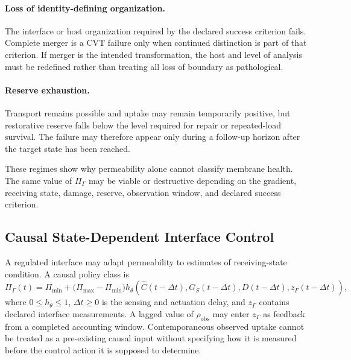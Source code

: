 \paragraph{Loss of identity-defining organization.}
The interface or host organization required by the declared success criterion fails. Complete merger is a CVT failure only when continued distinction is part of that criterion. If merger is the intended transformation, the host and level of analysis must be redefined rather than treating all loss of boundary as pathological.

\paragraph{Reserve exhaustion.}
Transport remains possible and uptake may remain temporarily positive, but restorative reserve falls below the level required for repair or repeated-load survival. The failure may therefore appear only during a follow-up horizon after the target state has been reached.

These regimes show why permeability alone cannot classify membrane health. The same value of \(\Pi_{\Gamma}\) may be viable or destructive depending on the gradient, receiving state, damage, reserve, observation window, and declared success criterion.

\subsection{Causal State-Dependent Interface Control}

A regulated interface may adapt permeability to estimates of receiving-state condition. A causal policy class is
\begin{equation}
    \Pi_{\Gamma}(t)
    =
    \Pi_{\min}
    +
    \bigl(\Pi_{\max}-\Pi_{\min}\bigr)
    h_{\theta}\!\left(
        \widehat C(t-\Delta t),
        G_S(t-\Delta t),
        D(t-\Delta t),
        z_{\Gamma}(t-\Delta t)
    \right),
    \label{eq:membrane-causal-control}
\end{equation}
where \(0\leq h_{\theta}\leq1\), \(\Delta t\geq0\) is the sensing and actuation delay, and \(z_{\Gamma}\) contains declared interface measurements. A lagged value of \(\rho_{\mathrm{obs}}\) may enter \(z_{\Gamma}\) as feedback from a completed accounting window. Contemporaneous observed uptake cannot be treated as a pre-existing causal input without specifying how it is measured before the control action it is supposed to determine.

